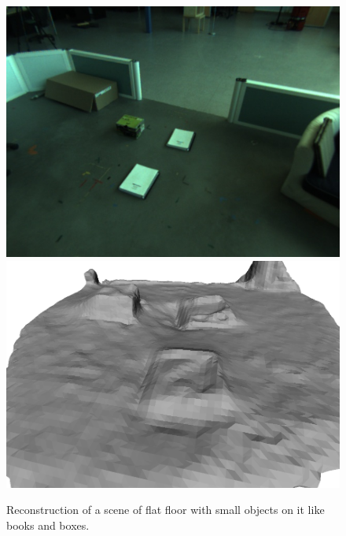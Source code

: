 \begin{figure}[h]
\centering
\includegraphics[scale=0.5]{Chap6-3D-Reconstruction/frame0005}
\includegraphics[scale=0.5]{Chap6-3D-Reconstruction/snapshot01}
\caption[]{Reconstruction of a scene of flat floor with small objects on it like books and boxes.}
\label{Fig:Reconstruction2}
\end{figure}

